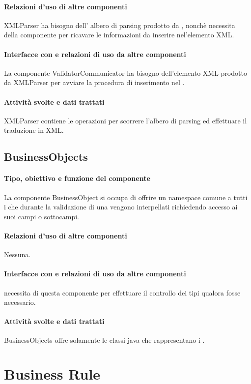 \documentclass[11pt,titlepage,a4paper]{report}
\begin{document}
\paragraph{Relazioni d'uso di altre componenti}
XMLParser ha bisogno dell' albero di parsing prodotto da \brp, nonch\`e necessita della componente \br per ricavare le informazioni da inserire nel'elemento XML.
\paragraph{Interfacce con e relazioni di uso da altre componenti}
La componente ValidatorCommunicator ha bisogno dell'elemento XML prodotto da XMLParser per avviare la procedura di inserimento nel \re.
\paragraph{Attivit\`a svolte e dati trattati}
XMLParser contiene le operazioni per scorrere l'albero di parsing ed effettuare il traduzione in XML.

\subsection{BusinessObjects}%
\paragraph{Tipo, obiettivo e funzione del componente}
La componente BusinessObject si occupa di offrire un namespace comune a tutti i \bos che durante la validazione di una \br vengono interpellati richiedendo accesso ai suoi campi o sottocampi.
\paragraph{Relazioni d'uso di altre componenti}
Nessuna.
\paragraph{Interfacce con e relazioni di uso da altre componenti}
\brp necessita di questa componente per effettuare il controllo dei tipi qualora fosse necessario.
\paragraph{Attivit\`a svolte e dati trattati}
BusinessObjects offre solamente le classi java che rappresentano i \bos.

\section{Business Rule}
\end{document}
